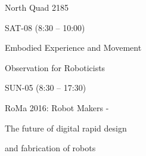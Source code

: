 \documentclass{article}
\begin{document}
\rssheader[2in]

\rssbig
\begin{center}
North Quad 2185
\end{center}

\vfill

\rssmed
\begin{center}
SAT-08 (8:30 -- 10:00)
\end{center}

\rsssm
\begin{center}
Embodied Experience and Movement \par \noindent Observation for Roboticists
\end{center}

\vfill

\rssmed
\begin{center}
SUN-05 (8:30 -- 17:30)
\end{center}

\rsssm
\begin{center}
RoMa 2016: Robot Makers - \par \noindent The future of digital rapid design
\par \noindent and fabrication of robots
\end{center}

\vfill
\end{document}
